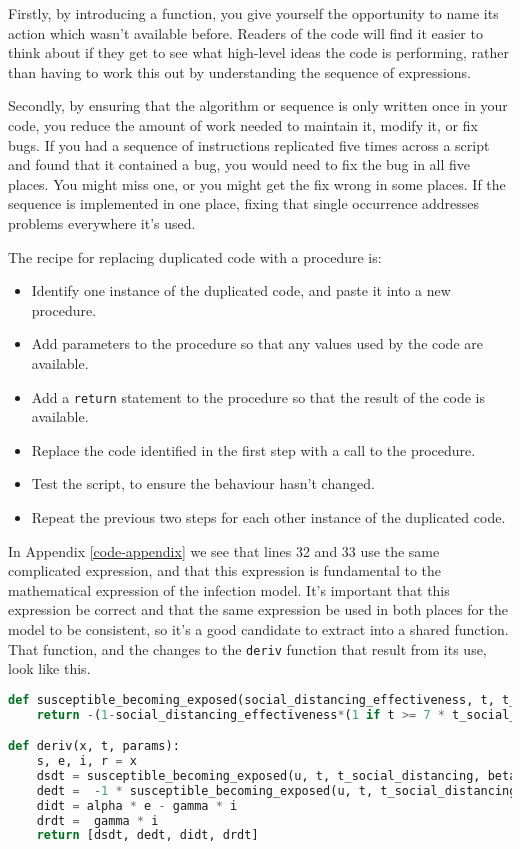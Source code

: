 \documentclass[a4paper]{article}
\begin{document}
Firstly, by introducing a function, you give yourself the opportunity to name its action which wasn't available before. Readers of the code will find it easier to think about if they get to see what high-level ideas the code is performing, rather than having to work this out by understanding the sequence of expressions.

Secondly, by ensuring that the algorithm or sequence is only written once in your code, you reduce the amount of work needed to maintain it, modify it, or fix bugs. If you had a sequence of instructions replicated five times across a script and found that it contained a bug, you would need to fix the bug in all five places. You might miss one, or you might get the fix wrong in some places. If the sequence is implemented in one place, fixing that single occurrence addresses problems everywhere it's used.

The recipe for replacing duplicated code with a procedure is:

\begin{itemize}
  \item Identify one instance of the duplicated code, and paste it into a new procedure.
  \item Add parameters to the procedure so that any values used by the code are available.
  \item Add a \texttt{return} statement to the procedure so that the result of the code is available.
  \item Replace the code identified in the first step with a call to the procedure.
  \item Test the script, to ensure the behaviour hasn't changed.
  \item Repeat the previous two steps for each other instance of the duplicated code.
\end{itemize}

In Appendix \ref{code-appendix} we see that lines 32 and 33 use the same complicated expression, and that this expression is fundamental to the mathematical expression of the infection model. It's important that this expression be correct and that the same expression be used in both places for the model to be consistent, so it's a good candidate to extract into a shared function. That function, and the changes to the \texttt{deriv} function that result from its use, look like this.

\begin{lstlisting}[language=Python]
def susceptible_becoming_exposed(social_distancing_effectiveness, t, t_social_distancing_start, beta, susceptible, infected):
    return -(1-social_distancing_effectiveness*(1 if t >= 7 * t_social_distancing_start else 0)/100)*beta * susceptible * infected

def deriv(x, t, params):
    s, e, i, r = x
    dsdt = susceptible_becoming_exposed(u, t, t_social_distancing, beta, s, i)
    dedt =  -1 * susceptible_becoming_exposed(u, t, t_social_distancing, beta, s, i) - alpha * e
    didt = alpha * e - gamma * i
    drdt =  gamma * i
    return [dsdt, dedt, didt, drdt]
\end{lstlisting}
\end{document}
